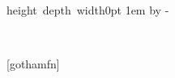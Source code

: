 {{			%
			\ifx\@thefnmark\@empty
				\insertfootnotetext\par%
			\else
				\hspace*{\SMSideFootnoteMarkerShift}\insertfootnotemark\,\insertfootnotetext\par%
			\fi
		}%
	\else
	\SMFootnoteBibFonts
	\setlength{\lineskip}{0.6pt}%
	\setbox\strutbox\hbox{\vrule height depth width0pt}%
	\parindent 1em\noindent%
	\raggedleft
	\advance\rightskip by -\SMFootnoteRightShift%
	\ifx\@thefnmark\@empty
		\insertfootnotetext\par%
	\else
		\insertfootnotemark\,\insertfootnotetext\par%
	\fi
	\fi
}
\makeatother
{}[gothamfn]

